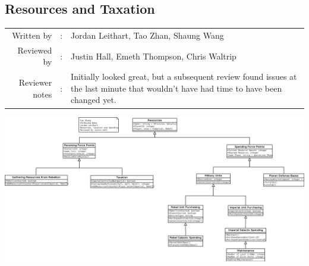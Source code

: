 \documentclass[12pt,letterpaper]{article}
\begin{document}
	\subsection{Resources and Taxation}
	\begin{tabularx}{\linewidth}{rcX}
				Written by & : & Jordan Leithart, Tao Zhan, Shaung Wang \\
				Reviewed by & : & Justin Hall, Emeth Thompson, Chris Waltrip \\
				Reviewer notes & : & Initially looked great, but a subsequent review found issues at the last minute that wouldn't have had time to have been changed yet.
	\end{tabularx}
		\includegraphics[width=\textwidth,height=\textheight,keepaspectratio]{./images/resources_taxation}
\end{document}

